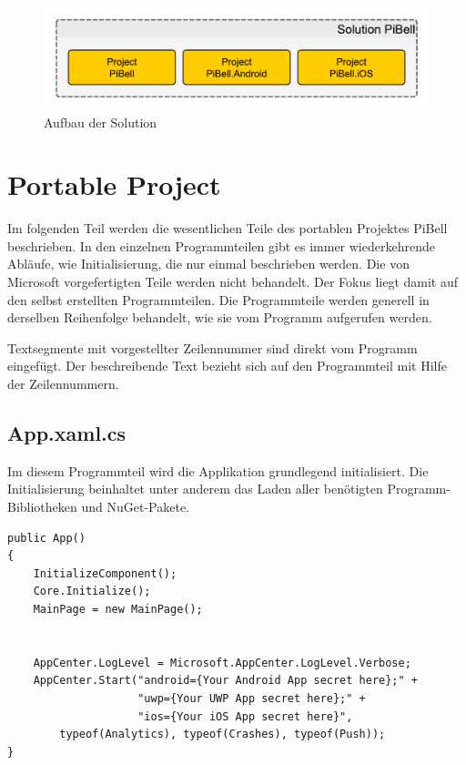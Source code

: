 \begin{figure}
\centering\includegraphics[width=0.9\linewidth]{images/xamarin/struktur.pdf}
\caption{Aufbau der Solution}
\label{fig:solution}
\end{figure}

%
\section{Portable Project}
Im folgenden Teil werden die wesentlichen Teile des portablen Projektes PiBell beschrieben.
In den einzelnen Programmteilen gibt es immer wiederkehrende Abläufe, wie Initialisierung, die nur einmal beschrieben werden.
Die von Microsoft vorgefertigten Teile werden nicht behandelt.
Der Fokus liegt damit auf den selbst erstellten Programmteilen.
Die Programmteile werden generell in derselben Reihenfolge behandelt, wie sie vom Programm aufgerufen werden.\par

Textsegmente mit vorgestellter Zeilennummer sind direkt vom Programm eingefügt.
Der beschreibende Text bezieht sich auf den Programmteil mit Hilfe der Zeilennummern.

\subsection{App.xaml.cs}
\label{ssec:app-xaml-cs}
Im diesem Programmteil wird die Applikation grundlegend initialisiert.
Die Initialisierung beinhaltet unter anderem das Laden aller benötigten Programm-Bibliotheken und NuGet-Pakete.
\begin{verbatim}
public App()
{
    InitializeComponent();
    Core.Initialize();
    MainPage = new MainPage();


    AppCenter.LogLevel = Microsoft.AppCenter.LogLevel.Verbose;
    AppCenter.Start("android={Your Android App secret here};" +
                    "uwp={Your UWP App secret here};" +
                    "ios={Your iOS App secret here}",
        typeof(Analytics), typeof(Crashes), typeof(Push));
}
\end{verbatim}
